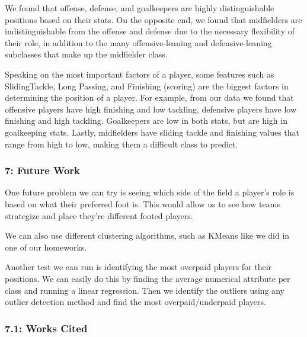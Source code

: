 \documentclass[11pt]{article}
\begin{document}
    We found that offense, defense, and goalkeepers are highly
distinguishable positions based on their stats. On the opposite end, we
found that midfielders are indistinguishable from the offense and
defense due to the necessary flexibility of their role, in addition to
the many offensive-leaning and defensive-leaning subclasses that make up
the midfielder class.

Speaking on the most important factors of a player, some features such
as SlidingTackle, Long Passing, and Finishing (scoring) are the biggest
factors in determining the position of a player. For example, from our
data we found that offensive players have high finishing and low
tackling, defensive players have low finishing and high tackling.
Goalkeepers are low in both stats, but are high in goalkeeping stats.
Lastly, midfielders have sliding tackle and finishing values that range
from high to low, making them a difficult class to predict.

    \hypertarget{future-work}{%
\subsubsection{7: Future Work}\label{future-work}}

    One future problem we can try is seeing which side of the field a
player's role is based on what their preferred foot is. This would allow
us to see how teams strategize and place they're different footed
players.

We can also use different clustering algorithms, such as KMeans like we
did in one of our homeworks.

Another test we can run is identifying the most overpaid players for
their positions. We can easily do this by finding the average numerical
attribute per class and running a linear regression. Then we identify
the outliers using any outlier detection method and find the most
overpaid/underpaid players.

    \hypertarget{works-cited}{%
\subsubsection{7.1: Works Cited}\label{works-cited}}
\end{document}
